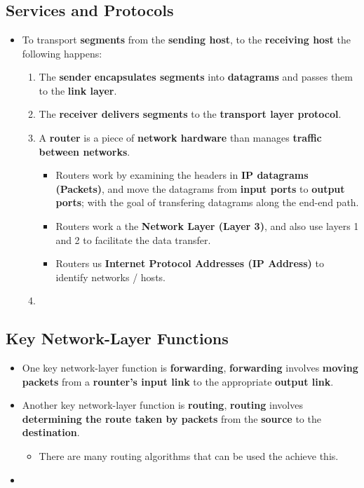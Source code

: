 \documentclass[16pt]{article}
\begin{document}
\section*{}

    \subsection*{Services and Protocols}
    \begin{itemize}
        \item To transport \textbf{segments} from the \textbf{sending host}, to the \textbf{receiving host} the following happens:
        \begin{enumerate}
            \item The \textbf{sender} \textbf{encapsulates segments} into \textbf{datagrams} and passes them to the \textbf{link layer}.
            \item The \textbf{receiver delivers segments} to the \textbf{transport layer protocol}. 
            \item A \textbf{router} is a piece of \textbf{network hardware} than manages \textbf{traffic between networks}.
            \begin{itemize}
                \item Routers work by examining the headers in \textbf{IP datagrams (Packets)}, and move the datagrams from \textbf{input ports} to \textbf{output ports}; with the goal of transfering datagrams along the end-end path.
                \item Routers work a the \textbf{Network Layer (Layer 3)}, and also use layers 1 and 2 to facilitate the data transfer.
                \item Routers us \textbf{Internet Protocol Addresses (IP Address)} to identify networks / hosts.
            \end{itemize}
            \item  
        \end{enumerate}
    \end{itemize}

    \subsection*{Key Network-Layer Functions}
    \begin{itemize}
        \item One key network-layer function is \textbf{forwarding}, \textbf{forwarding} involves \textbf{moving packets} from a \textbf{rounter's input link} to the appropriate \textbf{output link}.
        \item Another key network-layer function is \textbf{routing}, \textbf{routing} involves \textbf{determining the route taken by packets} from the \textbf{source} to the \textbf{destination}.
        \begin{itemize}
            \item There are many routing algorithms that can be used the achieve this.
        \end{itemize}
        \item 
    \end{itemize}
\end{document}
